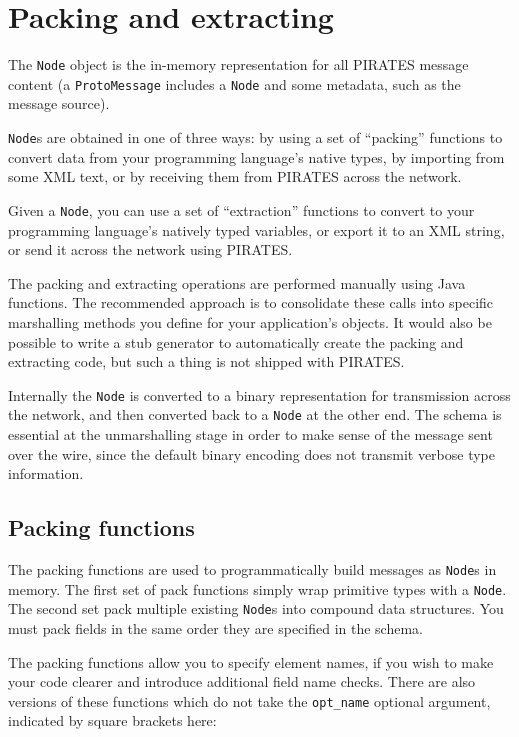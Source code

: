\documentclass[12pt,a4paper,twoside]{article}
\renewcommand{\_}{\texttt{\symbol{95}}}
\begin{document}
\section{Packing and extracting}

The \verb^Node^ object is the in-memory representation
for all PIRATES message content (a \verb^ProtoMessage^ includes
a \verb^Node^ and some metadata, such as the message source).

\verb^Node^s are obtained in one of three ways: by using a
set of ``packing'' functions to convert data from your programming
language's native types, by importing from some XML text, or by receiving
them from PIRATES across the network.

Given a \verb^Node^, you can use a set of ``extraction''
functions to convert to your programming language's natively
typed variables, or export it to an XML string, or send it
across the network using PIRATES.

The packing and extracting operations are
performed manually using Java functions. The recommended approach is to
consolidate these calls into specific marshalling methods you define
for your application's objects. It would also be possible to write
a stub generator to automatically create the packing and extracting
code, but such a thing is not shipped with PIRATES.

Internally the \verb^Node^ is converted to a binary
representation for transmission across the network, and then
converted back to a \verb^Node^ at the other end.
The schema is essential at the unmarshalling stage in order to
make sense of the message sent over the wire, since the default
binary encoding does not transmit verbose type information.

\subsection{Packing functions}

The packing functions are used to programmatically build messages as
\verb^Node^s in memory. The first set of pack functions simply wrap primitive
types with a \verb^Node^. The second set pack multiple existing
\verb^Node^s into compound data structures. You must pack fields
in the same order they are specified in the schema.

The packing functions allow you to specify element
names, if you wish to make your code clearer and introduce additional
field name checks. There are also versions of these functions
which do not take the \verb^opt_name^ optional argument,
indicated by square brackets here:
\end{document}
